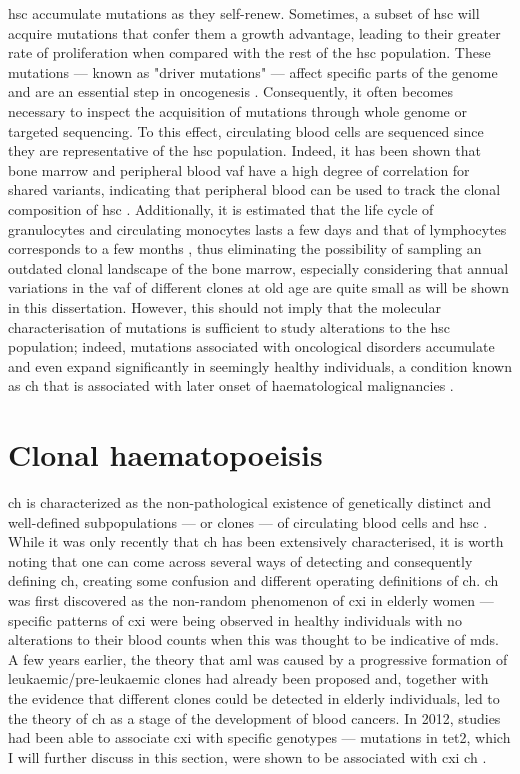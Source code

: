 \Ac{hsc} accumulate mutations as they self-renew. Sometimes, a subset of \ac{hsc} will acquire mutations that confer them a growth advantage, leading to their greater rate of proliferation when compared with the rest of the \ac{hsc} population. These mutations --- known as "driver mutations" --- affect specific parts of the genome and are an essential step in oncogenesis \cite{Stratton2009-id}. Consequently, it often becomes necessary to inspect the acquisition of mutations through whole genome or targeted sequencing. To this effect, circulating blood cells are sequenced since they are representative of the \ac{hsc} population. Indeed, it has been shown that bone marrow and peripheral blood \ac{vaf} have a high degree of correlation for shared variants, indicating that peripheral blood can be used to track the clonal composition of \ac{hsc} \cite{Patkar2018-lp,Tong2015-oq,Coffey2019-rr}. Additionally, it is estimated that the life cycle of granulocytes and circulating monocytes lasts a few days and that of lymphocytes corresponds to a few months \cite{Resegotti1957-ut,Lahoz-Beneytez2016-zq,Patel2017-qx}, thus eliminating the possibility of sampling an outdated clonal landscape of the bone marrow, especially considering that annual variations in the \ac{vaf} of different clones at old age are quite small as will be shown in this dissertation. However, this should not imply that the molecular characterisation of mutations is sufficient to study alterations to the \ac{hsc} population; indeed, mutations associated with oncological disorders accumulate and even expand significantly in seemingly healthy individuals, a condition known as \ac{ch} that is associated with later onset of haematological malignancies \cite{Jaiswal2014-rl}. 

\section{Clonal haematopoeisis}

\Ac{ch} is characterized as the non-pathological existence of genetically distinct and well-defined subpopulations --- or clones --- of circulating blood cells and \ac{hsc} \cite{Jan2017-rc}. While it was only recently that \ac{ch} has been extensively characterised, it is worth noting that one can come across several ways of detecting and consequently defining \ac{ch}, creating some confusion and different operating definitions of \ac{ch}. \Ac{ch} was first discovered as the non-random phenomenon of \ac{cxi} in elderly women \cite{Busque1996-ek,Champion1997-fj} --- specific patterns of \ac{cxi} were being observed in healthy individuals with no alterations to their blood counts when this was thought to be indicative of \ac{mds}. A few years earlier, the theory that \ac{aml} was caused by a progressive formation of leukaemic/pre-leukaemic clones had already been proposed \cite{Fialkow1991-de} and, together with the evidence that different clones could be detected in elderly individuals, led to the theory of \ac{ch} as a stage of the development of blood cancers. In 2012, studies had been able to associate \ac{cxi} with specific genotypes --- mutations in \ac{tet2}, which I will further discuss in this section, were shown to be associated with \ac{cxi} \ac{ch} \cite{Busque2012-oc}. 

